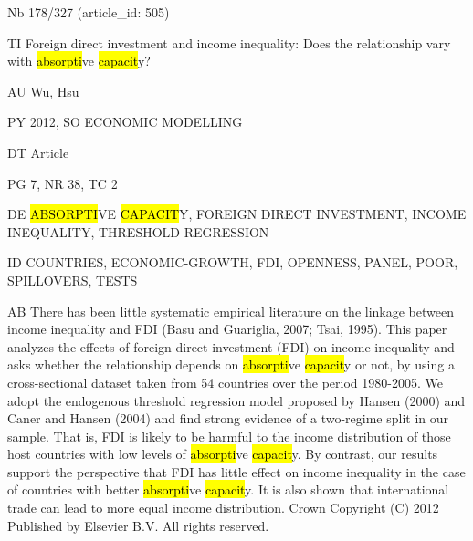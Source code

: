 \documentclass[a4paper]{article}
\begin{document}
\vspace*{-2cm}
Nb \tabto{0cm}178/327 (article\_id: 505)\par
TI \tabto{0cm}Foreign direct investment and income inequality: Does the relationship vary with \hl{absorpti}ve \hl{capacit}y?\par
AU \tabto{0cm}Wu, Hsu\par
PY \tabto{0cm}2012, SO ECONOMIC MODELLING\par
DT \tabto{0cm}Article\par
PG \tabto{0cm}7, NR 38, TC 2\par
DE \tabto{0cm}\hl{ABSORPTI}VE \hl{CAPACIT}Y, FOREIGN DIRECT INVESTMENT, INCOME INEQUALITY, THRESHOLD REGRESSION\par
ID \tabto{0cm}COUNTRIES, ECONOMIC-GROWTH, FDI, OPENNESS, PANEL, POOR, SPILLOVERS, TESTS\par
AB \tabto{0cm}There has been little systematic empirical literature on the linkage between income inequality and FDI (Basu and Guariglia, 2007; Tsai, 1995). This paper analyzes the effects of foreign direct investment (FDI) on income inequality and asks whether the relationship depends on \hl{absorpti}ve \hl{capacit}y or not, by using a cross-sectional dataset taken from 54 countries over the period 1980-2005. We adopt the endogenous threshold regression model proposed by Hansen (2000) and Caner and Hansen (2004) and find strong evidence of a two-regime split in our sample. That is, FDI is likely to be harmful to the income distribution of those host countries with low levels of \hl{absorpti}ve \hl{capacit}y. By contrast, our results support the perspective that FDI has little effect on income inequality in the case of countries with better \hl{absorpti}ve \hl{capacit}y. It is also shown that international trade can lead to more equal income distribution. Crown Copyright (C) 2012 Published by Elsevier B.V. All rights reserved.\par
\clearpage
\end{document}
